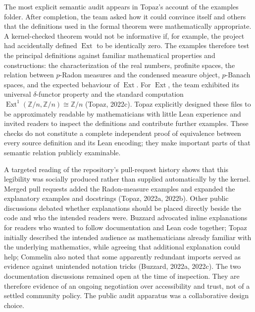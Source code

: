 \documentclass[pdflatex,sn-apa]{sn-jnl}
\begin{document}
The most explicit semantic audit appears in Topaz's account of the examples folder. After completion, the team asked how it could convince itself and others that the definitions used in the formal theorem were mathematically appropriate. A kernel-checked theorem would not be informative if, for example, the project had accidentally defined \(\operatorname{Ext}\) to be identically zero. The examples therefore test the principal definitions against familiar mathematical properties and constructions: the characterization of the real numbers, profinite spaces, the relation between \(p\)-Radon measures and the condensed measure object, \(p\)-Banach spaces, and the expected behaviour of \(\operatorname{Ext}\). For \(\operatorname{Ext}\), the team exhibited its universal \(\delta\)-functor property and the standard computation \(\operatorname{Ext}^1(\mathbb Z/n,\mathbb Z/n)\cong\mathbb Z/n\) (Topaz, 2022c). Topaz explicitly designed these files to be approximately readable by mathematicians with little Lean experience and invited readers to inspect the definitions and contribute further examples. These checks do not constitute a complete independent proof of equivalence between every source definition and its Lean encoding; they make important parts of that semantic relation publicly examinable.

A targeted reading of the repository's pull-request history shows that this legibility was socially produced rather than supplied automatically by the kernel. Merged pull requests added the Radon-measure examples and expanded the explanatory examples and docstrings (Topaz, 2022a, 2022b). Other public discussions debated whether explanations should be placed directly beside the code and who the intended readers were. Buzzard advocated inline explanations for readers who wanted to follow documentation and Lean code together; Topaz initially described the intended audience as mathematicians already familiar with the underlying mathematics, while agreeing that additional explanation could help; Commelin also noted that some apparently redundant imports served as evidence against unintended notation tricks (Buzzard, 2022a, 2022c). The two documentation discussions remained open at the time of inspection. They are therefore evidence of an ongoing negotiation over accessibility and trust, not of a settled community policy. The public audit apparatus was a collaborative design choice.
\end{document}

